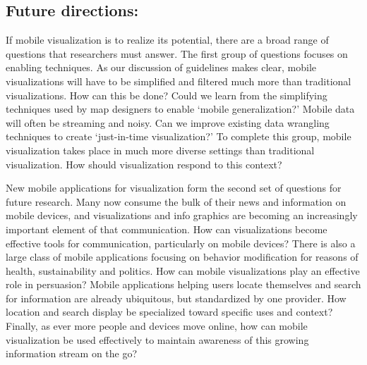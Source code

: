 \documentclass{sigchi-ext}
\begin{document}
\subsection{Future directions:} If mobile visualization is to realize its potential, there are a broad range of questions that researchers must answer. The first group of questions focuses on enabling techniques. As our discussion of guidelines makes clear, mobile visualizations will have to be simplified and filtered much more than traditional visualizations. How can this be done? Could we learn from the simplifying techniques used by map designers to enable `mobile generalization?' Mobile data will often be streaming and noisy. Can we improve existing data wrangling techniques to create `just-in-time visualization?' To complete this group, mobile visualization takes place in much more diverse settings than traditional visualization. How should visualization respond to this context? 

New mobile applications for visualization form the second set of questions for future research. Many now consume the bulk of their news and information on mobile devices, and visualizations and info graphics are becoming an increasingly important element of that communication. How can visualizations become effective tools for communication, particularly on mobile devices? There is also a large class of mobile applications focusing on behavior modification for reasons of health, sustainability and politics. How can mobile visualizations play an effective role in persuasion? Mobile applications helping users locate themselves and search for information are already ubiquitous, but standardized by one provider. How location and search display be specialized toward specific uses and context? Finally, as ever more people and devices move online, how can mobile visualization be used effectively to maintain awareness of this growing information stream on the go?
\end{document}
